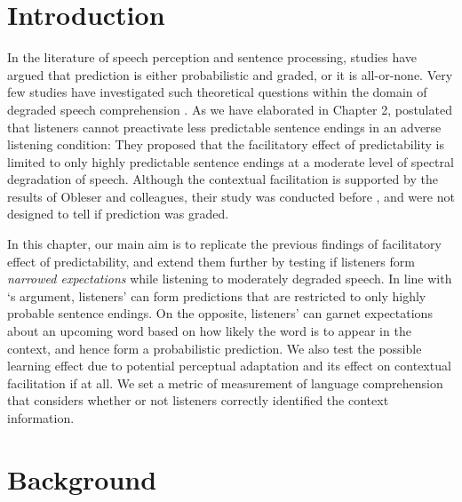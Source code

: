 \documentclass[a4paper, nobind]{templates/ociamthesis}
\begin{document}
\hypertarget{introduction-2}{%
\section{Introduction}\label{introduction-2}}

In the literature of speech perception and sentence processing, studies have argued that prediction is either probabilistic and graded, or it is all-or-none.
Very few studies have investigated such theoretical questions within the domain of degraded speech comprehension \autocites[e.g.][]{Strauss2013}[see also][]{Corps2020,vanOs2021}.
As we have elaborated in Chapter 2, \textcite{Strauss2013} postulated that listeners cannot preactivate less predictable sentence endings in an adverse listening condition:
They proposed that the facilitatory effect of predictability is limited to only highly predictable sentence endings at a moderate level of spectral degradation of speech.
Although the contextual facilitation is supported by the results of Obleser and colleagues,
their study was conducted before \textcite{Strauss2013}, and were not designed to tell if prediction was graded.

In this chapter, our main aim is to replicate the previous findings of facilitatory effect of predictability,
and extend them further by testing if listeners form \emph{narrowed expectations} while listening to moderately degraded speech.
In line with \textcite{Strauss2013}`s argument, listeners' can form predictions that are restricted to only highly probable sentence endings.
On the opposite, listeners' can garnet expectations about an upcoming word based on how likely the word is to appear in the context,
and hence form a probabilistic prediction.
We also test the possible learning effect due to potential perceptual adaptation and its effect on contextual facilitation if at all.
We set a metric of measurement of language comprehension that considers whether or not listeners correctly identified the context information.

\hypertarget{background-2}{%
\section{Background}\label{background-2}}
\end{document}
